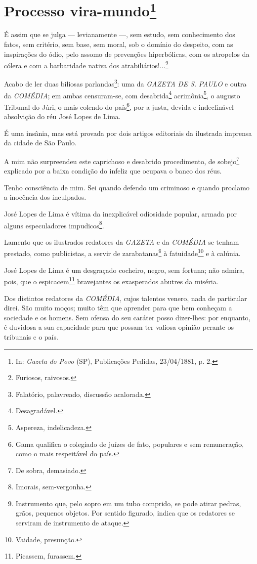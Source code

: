 \chapter{Processo vira-mundo\footnote[*]{In: \emph{Gazeta do Povo}
  (SP), Publicações Pedidas, 23/04/1881, p. 2.}}

É assim que se julga --- levianamente ---, sem estudo, sem
conhecimento dos fatos, sem critério, sem base, sem moral, sob o domínio
do despeito, com as inspirações do ódio, pelo assomo de prevenções
hiperbólicas, com os atropelos da cólera e com a barbaridade nativa dos
atrabiliários!...\footnote{Furiosos, raivosos.}

Acabo de ler duas biliosas parlandas\footnote{Falatório, palavreado,
  discussão acalorada.}: uma da \emph{GAZETA DE S. PAULO} e outra da
\emph{COMÉDIA}; em ambas censuram-se, com desabrida\footnote{
  Desagradável.} acrimônia\footnote{Aspereza, indelicadeza.}, o
augusto Tribunal do Júri, o mais colendo do país\footnote{Gama
  qualifica o colegiado de juízes de fato, populares e sem remuneração,
  como o mais respeitável do país.}, por a justa, devida e indeclinável
absolvição do réu José Lopes de Lima.

É uma insânia, mas está provada por dois artigos editoriais da ilustrada
imprensa da cidade de São Paulo.

A mim não surpreendeu este caprichoso e desabrido procedimento, de
sobejo\footnote{De sobra, demasiado.} explicado por a baixa condição
do infeliz que ocupava o banco dos réus.

Tenho consciência de mim. Sei quando defendo um criminoso e quando
proclamo a inocência dos inculpados.

José Lopes de Lima é vítima da inexplicável odiosidade popular, armada
por alguns especuladores impudicos\footnote{Imorais, sem-vergonha.}.

Lamento que os ilustrados redatores da \emph{GAZETA} e da \emph{COMÉDIA}
se tenham prestado, como publicistas, a servir de zarabatanas\footnote{
  Instrumento que, pelo sopro em um tubo comprido, se pode atirar
  pedras, grãos, pequenos objetos. Por sentido figurado, indica que os
  redatores se serviram de instrumento de ataque.} à fatuidade\footnote{
  Vaidade, presunção.} e à calúnia.

José Lopes de Lima é um desgraçado cocheiro, negro, sem fortuna; não
admira, pois, que o espicacem\footnote{Picassem, furassem.}
bravejantes os exasperados abutres da miséria.

Dos distintos redatores da \emph{COMÉDIA}, cujos talentos venero, nada
de particular direi. São muito moços; muito têm que aprender para que
bem conheçam a sociedade e os homens. Sem ofensa do seu caráter posso
dizer-lhes: por enquanto, é duvidosa a sua capacidade para que possam
ter valiosa opinião perante os tribunais e o país.

